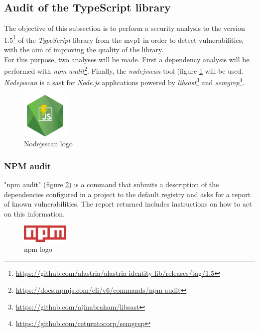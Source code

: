 \subsection{Audit of the TypeScript library}
The objective of this subsection is to perform a security analysis to the version 1.5\footnote{\url{https://github.com/alastria/alastria-identity-lib/releases/tag/1.5}\label{lib-version}} of the \textit{TypeScript} library from the \acrshort{mvp}1 in order to detect vulnerabilities, with the aim of improving the quality of the library.\\

For this purpose, two analyses will be made. First a dependency analysis will be performed with \textit{\acrshort{npm} audit}\footnote{\url{https://docs.npmjs.com/cli/v6/commands/npm-audit}}. Finally, the \textit{nodejsscan} tool (figure \ref{fig:nodejsscan-logo} will be used. \textit{Nodejsscan} is a \acrfull{sast} for \textit{Node.js} applications powered by \textit{libsast}\footnote{\url{https://github.com/ajinabraham/libsast}} and \textit{semgrep}\footnote{\url{https://github.com/returntocorp/semgrep}}.
\begin{figure}[h]
    \centering
    \includegraphics[width=0.2\textwidth]{images/Security Audit/nodejsscan-logo.png}
    \caption{Nodejsscan logo}
    \label{fig:nodejsscan-logo}
\end{figure}

\subsubsection{NPM audit}
"\acrshort{npm} audit" (figure \ref{fig:npmlogo}) is a command that submits a description of the dependencies configured in a project to the default registry and asks for a report of known vulnerabilities. The report returned includes instructions on how to act on this information.\\
\begin{figure}[h]
    \centering
    \includegraphics[width=0.2\textwidth]{images/Security Audit/npmlogo.png}
    \caption{\acrshort{npm} logo}
    \label{fig:npmlogo}
\end{figure}


